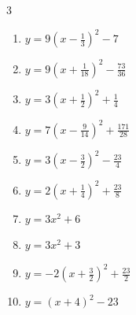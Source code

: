 \begin{multicols}{3}
\begin{enumerate}
  \item $\displaystyle y=9\left( x-\frac{1}{3}\right)^{2}-7$


\columnbreak %

  \item $\displaystyle y=9\left( x+\frac{1}{18}\right)^{2}-\frac{73}{36}$


  \item $\displaystyle y=3\left( x+\frac{1}{2}\right)^{2}+\frac{1}{4}$


  \item $\displaystyle y=7\left( x-\frac{9}{14}\right)^{2}+\frac{171}{28}$


  \item $\displaystyle y=3\left( x-\frac{3}{2}\right)^{2}-\frac{23}{4}$


  \item $\displaystyle y=2\left( x+\frac{1}{4}\right)^{2}+\frac{23}{8}$


  \item $\displaystyle y=3x^{2}+6$

        \phantom{$\displaystyle 頂点\left( 0 , 6 \right)$}

  \item $\displaystyle y=3x^{2}+3$

        \phantom{$\displaystyle 頂点\left( 0 , 3 \right)$}

  \item $\displaystyle y=-2\left( x+\frac{3}{2}\right)^{2}+\frac{23}{2}$


  \item $\displaystyle y=\left( x+4\right)^{2}-23$

        \phantom{$\displaystyle 頂点\left( -4 , -23 \right)$}


\end{enumerate}
\end{multicols}
